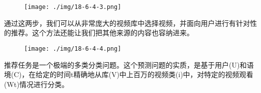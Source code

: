 \begin{figure}
\centering
\texttt{[image: ./img/18-6-4-3.png]}
\caption{}
\end{figure}

​
通过这两步，我们可以从非常庞大的视频库中选择视频，并面向用户进行有针对性的推荐。这个方法还能让我们把其他来源的内容也容纳进来。

\begin{figure}
\centering
\texttt{[image: ./img/18-6-4-4.png]}
\caption{}
\end{figure}

​
推荐任务是一个极端的多类分类问题。这个预测问题的实质，是基于用户(U)和语境(C)，在给定的时间t精确地从库(V)中上百万的视频类(i)中，对特定的视频观看(Wt)情况进行分类。


















